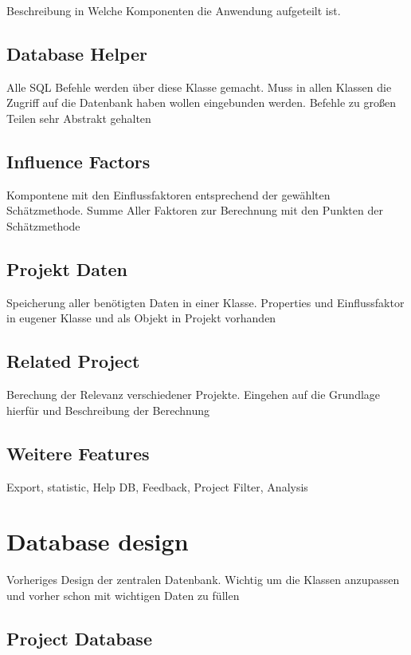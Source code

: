 Beschreibung in Welche Komponenten die Anwendung aufgeteilt ist.

\subsection{Database Helper}

Alle SQL Befehle werden über diese Klasse gemacht. Muss in allen Klassen die Zugriff auf die Datenbank haben wollen eingebunden werden. Befehle zu großen Teilen sehr Abstrakt gehalten

\subsection{Influence Factors}

Kompontene mit den Einflussfaktoren entsprechend der gewählten Schätzmethode. Summe Aller Faktoren zur Berechnung mit den Punkten der Schätzmethode

\subsection{Projekt Daten}

Speicherung aller benötigten Daten in einer Klasse. Properties und Einflussfaktor in eugener Klasse und als Objekt in Projekt vorhanden

\subsection{Related Project}

Berechung der Relevanz verschiedener Projekte. Eingehen auf die Grundlage hierfür und Beschreibung der Berechnung 

\subsection{Weitere Features}

Export, statistic, Help DB, Feedback, Project Filter, Analysis


\section{Database design}

Vorheriges Design der zentralen Datenbank. Wichtig um die Klassen anzupassen und vorher schon mit wichtigen Daten zu füllen

\subsection{Project Database}

